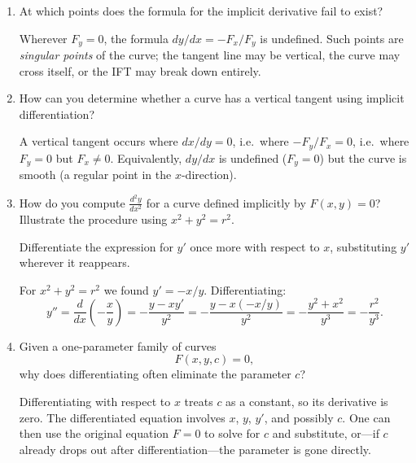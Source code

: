 \documentclass{self-check}
\begin{document}
\begin{enumerate}[leftmargin=*, itemsep=8pt]
  \item At which points does the formula for the implicit derivative
    fail to exist?

    \begin{answer} Wherever $F_y = 0$, the formula $dy/dx =
      -F_x/F_y$ is undefined.  Such points are \emph{singular points}
      of the curve; the tangent line may be vertical, the curve may
      cross itself, or the IFT may break down entirely.
    \end{answer}

  \item How can you determine whether a curve has a vertical tangent
    using implicit differentiation?

    \begin{answer} A vertical tangent occurs where $dx/dy = 0$,
      i.e.\ where $-F_y/F_x = 0$, i.e.\ where $F_y = 0$ but $F_x \neq
      0$.  Equivalently, $dy/dx$ is undefined ($F_y=0$) but the curve
      is smooth (a regular point in the $x$-direction).
    \end{answer}

  \item How do you compute $\frac{d^2y}{dx^2}$ for a curve defined
    implicitly by $F(x,y)=0$? Illustrate the procedure using $x^2+y^2=r^2$.

    \begin{answer} Differentiate the expression for $y'$ once more
      with respect to $x$, substituting $y'$ wherever it reappears.

      For $x^2+y^2=r^2$ we found $y'=-x/y$.  Differentiating:
      \[
        y'' = \frac{d}{dx}\!\left(-\frac{x}{y}\right)
        = -\frac{y - x y'}{y^2}
        = -\frac{y - x(-x/y)}{y^2}
        = -\frac{y^2 + x^2}{y^3}
        = -\frac{r^2}{y^3}.
      \]
    \end{answer}

  \item Given a one-parameter family of curves \[ F(x,y,c)=0, \] why
    does differentiating often eliminate the parameter \(c\)?

    \begin{answer} Differentiating with respect to $x$ treats $c$
      as a constant, so its derivative is zero.  The differentiated
      equation involves $x$, $y$, $y'$, and possibly $c$.  One can then
      use the original equation $F=0$ to solve for $c$ and substitute,
      or---if $c$ already drops out after differentiation---the
      parameter is gone directly.
    \end{answer}


\end{enumerate}
\end{document}
